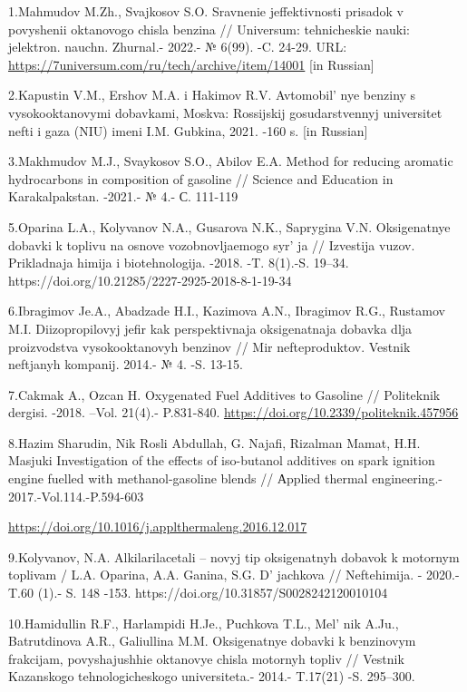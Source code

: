 \begin{references}
1.Mahmudov M.Zh., Svajkosov S.O. Sravnenie jeffektivnosti prisadok v
povyshenii oktanovogo chisla benzina // Universum: tehnicheskie nauki:
jelektron. nauchn. Zhurnal.- 2022.- № 6(99). -C. 24-29. URL:
\url{https://7universum.com/ru/tech/archive/item/14001} {[}in Russian{]}

2.Kapustin V.M., Ershov M.A. i Hakimov R.V.
Avtomobil' nye benziny s vysokooktanovymi dobavkami,
Moskva: Rossijskij gosudarstvennyj universitet nefti i gaza (NIU) imeni
I.M. Gubkina, 2021. -160 s. {[}in Russian{]}

3.Makhmudov M.J., Svaykosov S.O., Abilov E.A. Method for reducing
aromatic hydrocarbons in composition of gasoline // Science and
Education in Karakalpakstan. -2021.- № 4.- С. 111-119

5.Oparina L.A., Kolyvanov N.A., Gusarova N.K., Saprygina V.N.
Oksigenatnye dobavki k toplivu na osnove vozobnovljaemogo
syr' ja // Izvestija vuzov. Prikladnaja himija i
biotehnologija. -2018. -T. 8(1).-S. 19--34.
https://doi.org/10.21285/2227-2925-2018-8-1-19-34

6.Ibragimov Je.A., Abadzade H.I., Kazimova A.N., Ibragimov R.G.,
Rustamov M.I. Diizopropilovyj jefir kak perspektivnaja oksigenatnaja
dobavka dlja proizvodstva vysokooktanovyh benzinov // Mir
nefteproduktov. Vestnik neftjanyh kompanij. 2014.- № 4. -S. 13-15.

7.Cakmak A., Ozcan H. Oxygenated Fuel Additives to Gasoline //
Politeknik dergisi. -2018. --Vol. 21(4).- P.831-840.
\url{https://doi.org/10.2339/politeknik.457956}

8.Hazim Sharudin, Nik Rosli Abdullah, G. Najafi, Rizalman Mamat, H.H.
Masjuki Investigation of the effects of iso-butanol additives on spark
ignition engine fuelled with methanol-gasoline blends // Аpplied thermal
engineering.- 2017.-Vol.114.-P.594-603

\url{https://doi.org/10.1016/j.applthermaleng.2016.12.017}

9.Kolyvanov, N.A. Alkilarilacetali -- novyj tip oksigenatnyh dobavok k
motornym toplivam / L.A. Oparina, A.A. Ganina, S.G.
D' jachkova // Neftehimija. - 2020.- T.60 (1).- S. 148
-153. https://doi.org/10.31857/S0028242120010104

10.Hamidullin R.F., Harlampidi H.Je., Puchkova T.L.,
Mel' nik A.Ju., Batrutdinova A.R., Galiullina M.M.
Oksigenatnye dobavki k benzinovym frakcijam, povyshajushhie oktanovye
chisla motornyh topliv // Vestnik Kazanskogo tehnologicheskogo
universiteta.- 2014.- T.17(21) -S. 295--300.


\end{references}
